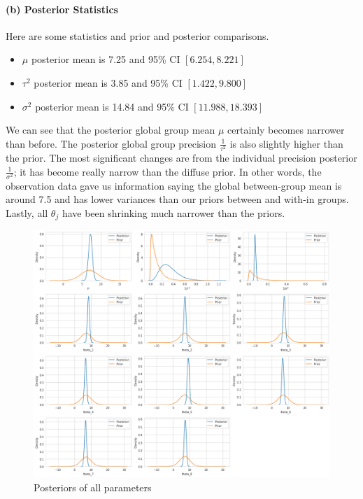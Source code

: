 \documentclass[11pt, letterpaper]{article}
\begin{document}
\paragraph{(b) Posterior Statistics}
Here are some statistics and prior and posterior comparisons.
\begin{itemize}
    \item $\mu$ posterior mean is 7.25 and 95\% CI $[6.254, 8.221]$
    \item $\tau^2$ posterior mean is 3.85 and 95\% CI $[1.422, 9.800]$
    \item $\sigma^2$ posterior mean is 14.84 and 95\% CI $[11.988, 18.393]$
\end{itemize}
We can see that the posterior global group mean $\mu$ certainly becomes narrower than before. The posterior global group precision $\frac{1}{\tau^2}$ is also slightly higher than the prior. The most significant changes are from the individual precision posterior $\frac{1}{\sigma^2}$; it has become really narrow than the diffuse prior. In other words, the observation data gave us information saying the global between-group mean is around 7.5 and has lower variances than our priors between and with-in groups. Lastly, all $\theta_j$ have been shrinking much narrower than the priors.
\begin{figure}[!h]
  \centering
  \includegraphics[width=1.0\textwidth]{3.b.png}
  \captionsetup{justification=centering}
  \caption{Posteriors of all parameters}
\end{figure}
\end{document}
